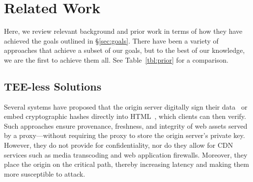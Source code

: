 \section{Related Work}
\label{sec:related}
% 


Here, we review relevant background and prior work in terms of how they have
achieved the goals outlined in \S\ref{sec:goals}.
%
There have been a variety of approaches that achieve a subset of our goals, but
to the best of our knowledge, we are the first to achieve them all.
%
See Table~\ref{tbl:prior} for a comparison.


\subsection{TEE-less Solutions}


%
Several systems have proposed that the origin server digitally
sign their data~\cite{cdn-on-demand,stickler} or embed cryptographic hashes
directly into
HTML~\cite{w3c-subresource-integrity,w3c-content-security-policy}, which
clients can then verify.
%
Such approaches ensure provenance, freshness, and integrity of web assets
served by a proxy---without requiring the proxy to store the origin server's
private key.
%
However, they do not provide for confidentiality, nor do they allow for CDN
services such as media transcoding and web application firewalls.
%
Moreover, they place the origin on the critical path, thereby increasing
latency and making them more susceptible to attack.





